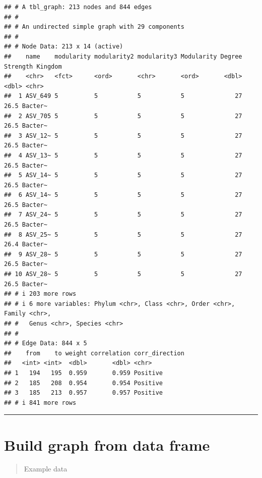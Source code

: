 \documentclass[
]{book}
\newenvironment{Shaded}{\begin{snugshade}}{\end{snugshade}}
\newcommand{\CommentTok}[1]{\textcolor[rgb]{0.56,0.35,0.01}{\textit{#1}}}
\newcommand{\FunctionTok}[1]{\textcolor[rgb]{0.13,0.29,0.53}{\textbf{#1}}}
\newcommand{\NormalTok}[1]{#1}
\newcommand{\OtherTok}[1]{\textcolor[rgb]{0.56,0.35,0.01}{#1}}
\newcommand{\SpecialCharTok}[1]{\textcolor[rgb]{0.81,0.36,0.00}{\textbf{#1}}}
\newcommand{\StringTok}[1]{\textcolor[rgb]{0.31,0.60,0.02}{#1}}
\begin{document}
\begin{verbatim}
## # A tbl_graph: 213 nodes and 844 edges
## #
## # An undirected simple graph with 29 components
## #
## # Node Data: 213 x 14 (active)
##    name    modularity modularity2 modularity3 Modularity Degree Strength Kingdom
##    <chr>   <fct>      <ord>       <chr>       <ord>       <dbl>    <dbl> <chr>  
##  1 ASV_649 5          5           5           5              27     26.5 Bacter~
##  2 ASV_705 5          5           5           5              27     26.5 Bacter~
##  3 ASV_12~ 5          5           5           5              27     26.5 Bacter~
##  4 ASV_13~ 5          5           5           5              27     26.5 Bacter~
##  5 ASV_14~ 5          5           5           5              27     26.5 Bacter~
##  6 ASV_14~ 5          5           5           5              27     26.5 Bacter~
##  7 ASV_24~ 5          5           5           5              27     26.5 Bacter~
##  8 ASV_25~ 5          5           5           5              27     26.4 Bacter~
##  9 ASV_28~ 5          5           5           5              27     26.5 Bacter~
## 10 ASV_28~ 5          5           5           5              27     26.5 Bacter~
## # i 203 more rows
## # i 6 more variables: Phylum <chr>, Class <chr>, Order <chr>, Family <chr>,
## #   Genus <chr>, Species <chr>
## #
## # Edge Data: 844 x 5
##    from    to weight correlation corr_direction
##   <int> <int>  <dbl>       <dbl> <chr>         
## 1   194   195  0.959       0.959 Positive      
## 2   185   208  0.954       0.954 Positive      
## 3   185   213  0.957       0.957 Positive      
## # i 841 more rows
\end{verbatim}

\begin{center}\rule{0.5\linewidth}{0.5pt}\end{center}

\section{Build graph from data frame}\label{build-graph-from-data-frame}

\begin{quote}
Example data
\end{quote}

\begin{Shaded}
\end{Shaded}
\end{document}

